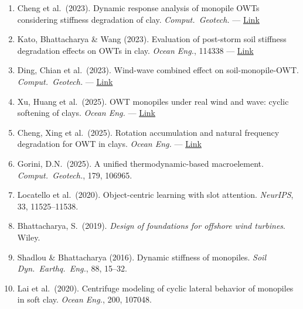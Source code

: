 \documentclass[11pt,a4paper]{article}
\begin{document}
\begin{enumerate}[noitemsep]
  \item Cheng et al.\ (2023). Dynamic response analysis of monopile OWTs considering
        stiffness degradation of clay. \textit{Comput.\ Geotech.} ---
        \href{https://www.sciencedirect.com/science/article/pii/S0266352X2200547X}{Link}

  \item Kato, Bhattacharya \& Wang (2023). Evaluation of post-storm soil stiffness
        degradation effects on OWTs in clay. \textit{Ocean Eng.}, 114338 ---
        \href{https://www.sciencedirect.com/science/article/pii/S0029801823007229}{Link}

  \item Ding, Chian et al.\ (2023). Wind-wave combined effect on soil-monopile-OWT.
        \textit{Comput.\ Geotech.} ---
        \href{https://www.sciencedirect.com/science/article/pii/S0266352X2200461X}{Link}

  \item Xu, Huang et al.\ (2025). OWT monopiles under real wind and wave:
        cyclic softening of clays. \textit{Ocean Eng.} ---
        \href{https://www.sciencedirect.com/science/article/pii/S0029801825001647}{Link}

  \item Cheng, Xing et al.\ (2025). Rotation accumulation and natural frequency
        degradation for OWT in clays. \textit{Ocean Eng.} ---
        \href{https://www.sciencedirect.com/science/article/pii/S0029801824030993}{Link}

  \item Gorini, D.N.\ (2025). A unified thermodynamic-based macroelement. \textit{Comput.\
        Geotech.}, 179, 106965.

  \item Locatello et al.\ (2020). Object-centric learning with slot attention.
        \textit{NeurIPS}, 33, 11525--11538.

  \item Bhattacharya, S.\ (2019). \textit{Design of foundations for offshore wind
        turbines}. Wiley.

  \item Shadlou \& Bhattacharya (2016). Dynamic stiffness of monopiles. \textit{Soil
        Dyn.\ Earthq.\ Eng.}, 88, 15--32.

  \item Lai et al.\ (2020). Centrifuge modeling of cyclic lateral behavior of
        monopiles in soft clay. \textit{Ocean Eng.}, 200, 107048.
\end{enumerate}
\end{document}
